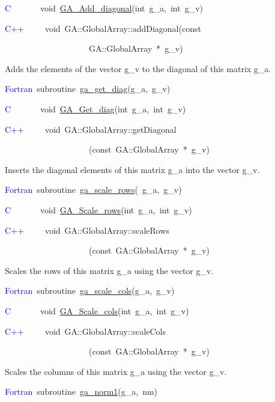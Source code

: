 \textcolor{blue}{C}~~~~~~~void~\href{https://hpc.pnl.gov/globalarrays/api/c_op_api.html\#ga_add_diagonal}{GA\_{}Add\_{}diagonal}(int~g\_a,~int~g\_v)

\textcolor{blue}{C++}~~~~~void~GA::GlobalArray::addDiagonal(const~

~~~~~~~~~~~~~~~~~~~~GA::GlobalArray~{*}~g\_v)

Adds the elements of the vector g\_v to the diagonal of this matrix
g\_a. 

\textcolor{blue}{Fortran}~subroutine~\href{https://hpc.pnl.gov/globalarrays/api/f_op_api.html\#ga_get_diag}{ga\_{}get\_{}diag}(g\_a,~g\_v)~

\textcolor{blue}{C}~~~~~~~void~\href{https://hpc.pnl.gov/globalarrays/api/c_op_api.html\#ga_get_diag}{GA\_{}Get\_{}diag}(int~g\_a,~int~g\_v)

\textcolor{blue}{C++~}~~~~void~GA::GlobalArray::getDiagonal

~~~~~~~~~~~~~~~~~~~~(const~GA::GlobalArray~{*}~g\_v)

Inserts the diagonal elements of this matrix g\_a into the vector
g\_v. 

\textcolor{blue}{Fortran}~subroutine~\href{https://hpc.pnl.gov/globalarrays/api/f_op_api.html\#ga_scale_rows}{ga\_{}scale\_{}rows}(~g\_a,~g\_v)

\textcolor{blue}{C}~~~~~~~void~\href{https://hpc.pnl.gov/globalarrays/api/c_op_api.html\#ga_scale_rows}{GA\_{}Scale\_{}rows}(int~g\_a,~int~g\_v)~

\textcolor{blue}{C++}~~~~~void~GA::GlobalArray::scaleRows

~~~~~~~~~~~~~~~~~~~~(const~GA::GlobalArray~{*}~g\_v)

Scales the rows of this matrix g\_a using the vector g\_v. 

\textcolor{blue}{Fortran}~subroutine~\href{https://hpc.pnl.gov/globalarrays/api/f_op_api.html\#ga_scale_cols}{ga\_{}scale\_{}cols}(g\_a,~g\_v)~

\textcolor{blue}{C}~~~~~~~void~\href{https://hpc.pnl.gov/globalarrays/api/c_op_api.html\#ga_scale_cols}{GA\_{}Scale\_{}cols}(int~g\_a,~int~g\_v)~

\textcolor{blue}{C++}~~~~~void~GA::GlobalArray::scaleCols

~~~~~~~~~~~~~~~~~~~~(const~GA::GlobalArray~{*}~g\_v)

Scales the columns of this matrix g\_a using the vector g\_v. 

\textcolor{blue}{Fortran}~subroutine~\href{https://hpc.pnl.gov/globalarrays/api/f_op_api.html\#ga_norm1}{ga\_{}norm1}(g\_a,~nm)


